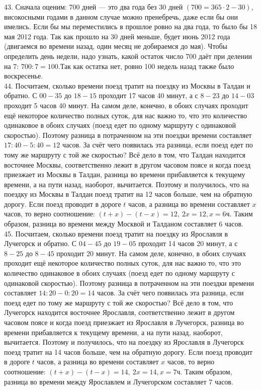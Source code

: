 \documentclass[12pt]{article}
\begin{document}
43. Сначала оценим: 700 дней --- это два года без 30 дней $(700=365\cdot2-30),$ високосными годами в данном случае можно пренебречь, даже если бы они имелись. Если бы мы переместились в прошлое ровно на два года, то было бы 18 мая 2012 года. Так как прошло на 30 дней меньше, будет июнь 2012 года (двигаемся во времени назад, один месяц не добираемся до мая). Чтобы определить день недели, надо узнать, какой остаток число 700 даёт при делении на 7: $700:7=100.$Так как остатка нет, ровно 100 недель назад также было воскресенье.\\
44. Посчитаем, сколько времени поезд тратит на поездку из Москвы в Талдан и обратно. С $00-35$ до $18-15$ проходит 17 часов 40 минут, а с $8-23$ до $14-03$ проходит 5 часов 40 минут. На самом деле, конечно, в обоих случаях проходит ещё некоторое количество полных суток, для нас важно то, что это количество одинаковое в обоих случаях (поезд едет по одному маршруту с одинаковой скоростью). Поэтому разница в потраченном на эти поездки времени составляет $17:40-5:40=12$ часов. За счёт чего появилась эта разница, если поезд едет по тому же маршруту с той же скоростью? Всё дело в том, что Талдан находится восточнее Москвы, соответственно лежит в другом часовом поясе и когда поезд приезжает из Москвы в Талдан, разница во времени прибавляется к текущему времени, а на пути назад, наоборот, вычитается. Поэтому и получилось, что на поездку из Москвы в Талдан поезд тратит на 12 часов больше, чем на обратную дорогу. Если поезд проводит в дороге $t$ часов, а разница во времени составляет $x$ часов, то верно соотношение: $(t+x)-(t-x)=12,\ 2x=12, x=6$ч. Таким образом, разница во времени между Москвой и Талданом составляет 6 часов.\\
45. Посчитаем, сколько времени поезд тратит на поездку из Ярославля в Лучегорск и обратно. С $04-45$ до $19-05$ проходит 14 часов 20 минут, а с $8-25$ до $8-45$ проходит 20 минут. На самом деле, конечно, в обоих случаях проходит ещё некоторое количество полных суток, для нас важно то, что это количество одинаковое в обоих случаях (поезд едет по одному маршруту с одинаковой скоростью). Поэтому разница в потраченном на эти поездки времени составляет $14:20-0:20=14$ часов. За счёт чего появилась эта разница, если поезд едет по тому же маршруту с той же скоростью? Всё дело в том, что Лучегорск находится восточнее Ярославля, соответственно лежит в другом часовом поясе и когда поезд приезжает из Ярославля в Лучегорск, разница во времени прибавляется к текущему времени, а на пути назад, наоборот, вычитается. Поэтому и получилось, что на поездку из Ярославля в Лучегорск поезд тратит на 14 часов больше, чем на обратную дорогу. Если поезд проводит в дороге $t$ часов, а разница во времени составляет $x$ часов, то верно соотношение: $(t+x)-(t-x)=14,\ 2x=14, x=7$ч. Таким образом, разница во времени между Ярославлем и Лучегорском составляет 7 часов.\\
\end{document}
